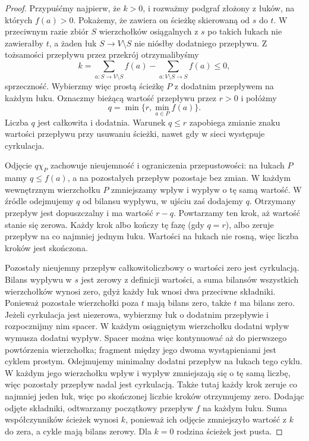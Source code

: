 \begin{proof}
Przypuśćmy najpierw, że $k>0$, i rozważmy
podgraf złożony z łuków, na których $f(a)>0$.
Pokażemy, że zawiera on ścieżkę skierowaną
od $s$ do $t$. W przeciwnym razie zbiór $S$
wierzchołków osiągalnych z $s$ po takich łukach
nie zawierałby $t$, a żaden łuk
$S\to V\setminus S$ nie niósłby dodatniego
przepływu. Z tożsamości przepływu przez przekrój
otrzymalibyśmy
\[
k=\sum_{a\colon S\to V\setminus S}f(a)
  -\sum_{a\colon V\setminus S\to S}f(a)\leq0,
\]
sprzeczność. Wybierzmy więc prostą ścieżkę $P$
z dodatnim przepływem na każdym łuku. Oznaczmy
bieżącą wartość przepływu przez $r>0$ i połóżmy
\[
q=\min\{r,\min_{a\in P}f(a)\}.
\]
Liczba $q$ jest całkowita i dodatnia.
Warunek $q\leq r$ zapobiega zmianie znaku wartości
przepływu przy usuwaniu ścieżki, nawet gdy
w sieci występuje cyrkulacja.

Odjęcie $q\chi_P$ zachowuje
nieujemność i ograniczenia przepustowości:
na łukach $P$ mamy $q\leq f(a)$, a na pozostałych
przepływ pozostaje bez zmian. W każdym wewnętrznym
wierzchołku $P$ zmniejszamy wpływ i wypływ
o tę samą wartość. W źródle odejmujemy $q$
od bilansu wypływu, w ujściu zaś dodajemy $q$.
Otrzymany przepływ jest dopuszczalny i ma
wartość $r-q$.
Powtarzamy ten krok, aż wartość stanie się zerowa.
Każdy krok albo kończy tę fazę (gdy $q=r$),
albo zeruje przepływ na co najmniej jednym łuku.
Wartości na łukach nie rosną, więc liczba kroków
jest skończona.

Pozostały nieujemny przepływ całkowitoliczbowy
o wartości zero jest cyrkulacją. Bilans wypływu
w $s$ jest zerowy z definicji wartości, a suma
bilansów wszystkich wierzchołków wynosi zero,
gdyż każdy łuk wnosi dwa przeciwne składniki.
Ponieważ pozostałe wierzchołki poza $t$ mają
bilans zero, także $t$ ma bilans zero.
Jeżeli cyrkulacja jest niezerowa, wybierzmy
łuk o dodatnim przepływie i rozpocznijmy nim spacer.
W każdym osiągniętym wierzchołku dodatni wpływ
wymusza dodatni wypływ. Spacer można więc kontynuować
aż do pierwszego powtórzenia wierzchołka; fragment
między jego dwoma wystąpieniami jest cyklem prostym.
Odejmujemy minimalny dodatni przepływ na łukach
tego cyklu. W każdym jego wierzchołku wpływ
i wypływ zmniejszają się o tę samą liczbę,
więc pozostały przepływ nadal jest cyrkulacją. Także tutaj każdy krok
zeruje co najmniej jeden łuk, więc
po skończonej liczbie kroków otrzymujemy zero.
Dodając odjęte składniki, odtwarzamy początkowy
przepływ $f$ na każdym łuku. Suma współczynników
ścieżek wynosi $k$, ponieważ ich odjęcie zmniejszyło
wartość z $k$ do zera, a cykle mają bilans zerowy.
Dla $k=0$ rodzina ścieżek jest pusta.


\end{proof}

